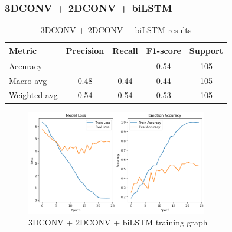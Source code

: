 \documentclass{article}
\begin{document}
\subsubsection{3DCONV + 2DCONV + biLSTM}

\begin{table}[H]
\centering
\caption{3DCONV + 2DCONV + biLSTM results}
\begin{tabular}{|l|c|c|c|c|}
\hline
\textbf{Metric} & \textbf{Precision} & \textbf{Recall} & \textbf{F1-score} & \textbf{Support} \\
\hline
Accuracy       & --   & --   & 0.54 & 105 \\
Macro avg      & 0.48 & 0.44 & 0.44 & 105 \\
Weighted avg   & 0.54 & 0.54 & 0.53 & 105 \\
\hline
\end{tabular}%
\label{tab:table8}
\end{table}

\begin{figure}[H]
  \begin{center}
    \includegraphics*[width=0.7\textwidth]{Figures/Picture12.png}
  \end{center}
  \caption{3DCONV + 2DCONV + biLSTM training graph}
  \label{fig:fig12}
\end{figure}
\end{document}
